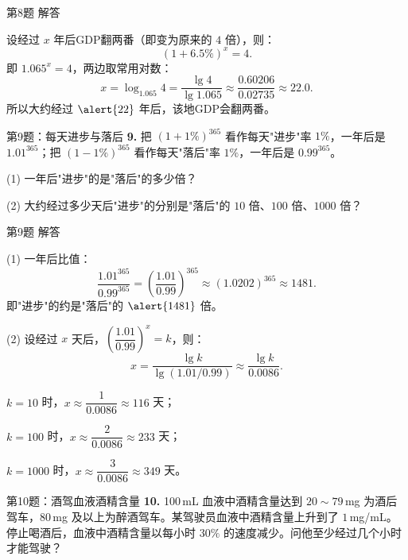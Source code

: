\documentclass[10pt,aspectratio=169,serif]{beamer}
\begin{document}
\begin{frame}[t]{第8题 解答}
\begin{tcolorbox}[colback=orange!10,colframe=orange,title=\textbf{解}]
设经过 $x$ 年后GDP翻两番（即变为原来的 $4$ 倍），则：
\[
(1+6.5\%)^x = 4.
\]
即 $1.065^x = 4$，两边取常用对数：
\[
x = \log_{1.065} 4 = \frac{\lg 4}{\lg 1.065} \approx \frac{0.60206}{0.02735} \approx 22.0.
\]
所以大约经过 $\alert{22}$ 年后，该地GDP会翻两番。
\end{tcolorbox}
\end{frame}

\begin{frame}[t]{第9题：每天进步与落后}
\textbf{9.} 把 $(1+1\%)^{365}$ 看作每天"进步"率 $1\%$，一年后是 $1.01^{365}$；把 $(1-1\%)^{365}$ 看作每天"落后"率 $1\%$，一年后是 $0.99^{365}$。

\vspace{0.5em}
(1) 一年后"进步"的是"落后"的多少倍？

(2) 大约经过多少天后"进步"的分别是"落后"的 $10$ 倍、$100$ 倍、$1000$ 倍？
\end{frame}

\begin{frame}[t]{第9题 解答}
\begin{tcolorbox}[colback=orange!10,colframe=orange,title=\textbf{解}]
(1) 一年后比值：
\[
\frac{1.01^{365}}{0.99^{365}} = \left(\frac{1.01}{0.99}\right)^{365} \approx (1.0202)^{365} \approx 1481.
\]
即"进步"的约是"落后"的 $\alert{1481}$ 倍。

(2) 设经过 $x$ 天后，$\left(\dfrac{1.01}{0.99}\right)^x = k$，则：
\[
x = \frac{\lg k}{\lg(1.01/0.99)} \approx \frac{\lg k}{0.0086}.
\]

\vspace{0.3em}
$k=10$ 时，$x\approx \dfrac{1}{0.0086}\approx 116$ 天；

$k=100$ 时，$x\approx \dfrac{2}{0.0086}\approx 233$ 天；

$k=1000$ 时，$x\approx \dfrac{3}{0.0086}\approx 349$ 天。
\end{tcolorbox}
\end{frame}

\begin{frame}[t]{第10题：酒驾血液酒精含量}
\textbf{10.} 100\,mL 血液中酒精含量达到 $20\sim 79$\,mg 为酒后驾车，$80$\,mg 及以上为醉酒驾车。某驾驶员血液中酒精含量上升到了 $1$\,mg/mL。停止喝酒后，血液中酒精含量以每小时 $30\%$ 的速度减少。问他至少经过几个小时才能驾驶？
\end{frame}
\end{document}
